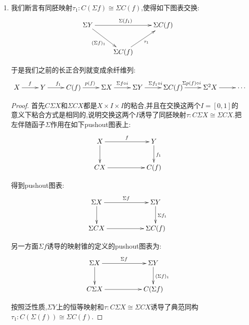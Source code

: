 \begin{enumerate}
    我们断言虚线的$\Sigma(f)\circ i$,其中$i:\Sigma X\to\Sigma X$为$(x,s)\mapsto(x,1-s)$,使得以虚线为边的这个小三角形在$\textbf{hTop}_*$中交换.在$\textbf{hTop}_*$中替换同构(这里就是同伦等价)不影响一个序列是正合与余正合的,于是我们得到如下长正合列:
    $$\xymatrix{X\ar[r]^f&Y\ar[r]^{f_1}&C(f)\ar[r]^{p(f)}&\Sigma X\ar[r]^{\Sigma(f)\circ i}&\Sigma Y}$$
    \begin{proof}
    	
    	我们要证明的是有同伦$\Sigma(f)\circ i\circ q(f)\simeq p(f_1)$.我们解释过$q(f)$的同伦逆是$s(f)$,于是等价于证明$\Sigma(f)\circ i\simeq p(f_1)\circ s(f)$.这里左侧是$(x,s)\mapsto(f(x),1-s)$,右侧是$(x,s)\mapsto(f(x),\min\{1,2(1-s)\})$.但是$1-s$和$\min\{1,2(1-s)\}$在$s\in[0,1]$上是同伦的.
    \end{proof}
    \item 我们断言有同胚映射$\tau_1:C(\Sigma f)\cong\Sigma C(f)$,使得如下图表交换:
    $$\xymatrix{\Sigma Y\ar[rr]^{\Sigma(f_1)}\ar[dr]_{(\Sigma f)_1}&&\Sigma C(f)\\&\Sigma C(f)\ar[ur]_{\tau_1}&}$$
    
    于是我们之前的长正合列就变成余纤维列:
    $$\xymatrix{X\ar[r]^f&Y\ar[r]^{f_1}&C(f)\ar[r]^{p(f)}&\Sigma X\ar[r]^{\Sigma f\circ i}&\Sigma Y\ar[r]^{\Sigma f_1\circ i}&\Sigma C(f)\ar[r]^{\Sigma p(f)\circ i}&\Sigma^2 X\ar[r]&\cdots}$$
    \begin{proof}
    	
    	首先$C\Sigma X$和$\Sigma CX$都是$X\times I\times I$的粘合,并且在交换这两个$I=[0,1]$的意义下粘合方式是相同的,说明交换这两个$I$诱导了同胚映射$\tau:C\Sigma X\cong\Sigma CX$.把左伴随函子$\Sigma$作用在如下pushout图表上:
    	$$\xymatrix{X\ar[rr]^f\ar[d]&&Y\ar[d]^{f_1}\\CX\ar[rr]&&C(f)}$$
    	
    	得到pushout图表:
    	$$\xymatrix{\Sigma X\ar[rr]^{\Sigma f}\ar[d]&&\Sigma Y\ar[d]^{\Sigma f_1}\\\Sigma CX\ar[rr]&&\Sigma C(f)}$$
    	
    	另一方面$\Sigma f$诱导的映射锥的定义的pushout图表为:
    	$$\xymatrix{\Sigma X\ar[rr]^{\Sigma f}\ar[d]&&\Sigma Y\ar[d]^{(\Sigma f)_1}\\C\Sigma X\ar[rr]&&C(\Sigma f)}$$
    	
    	按照泛性质,$\Sigma Y$上的恒等映射和$\tau:C\Sigma X\cong\Sigma CX$诱导了典范同构$\tau_1:C(\Sigma(f))\cong\Sigma C(f)$.
    \end{proof}
\end{enumerate}

